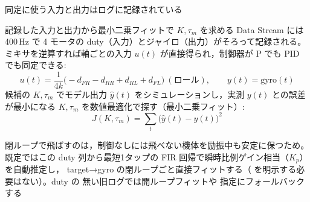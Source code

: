 \begin{frame}{同定に使う入力と出力はログに記録されている\later}
  \begin{block}{記録した入力と出力から最小二乗フィットで $K,\tau_m$ を求める}
    \footnotesize
    \setlength{\abovedisplayskip}{2pt}\setlength{\belowdisplayskip}{2pt}%
    Data Stream には 400\,Hz で 4 モータの duty（入力）とジャイロ（出力）がそろって記録される。
    ミキサを逆算すれば軸ごとの入力 $u(t)$ が直接得られ，制御器が P でも PID でも同定できる:
    \[
      u(t) = \frac{1}{4k}\bigl(-d_{FR} - d_{RR} + d_{RL} + d_{FL}\bigr)\ (\text{ロール}), \qquad
      y(t) = \text{gyro}(t)
    \]
    候補の $K,\tau_m$ でモデル出力 $\hat y(t)$ をシミュレーションし，実測
    $y(t)$ との誤差が最小になる $K,\tau_m$ を数値最適化で探す（最小二乗フィット）:
    \[
      J(K,\tau_m) = \sum_t \bigl(\hat y(t) - y(t)\bigr)^2
    \]
  \end{block}
  {\scriptsize 閉ループで飛ばすのは，制御なしには飛べない機体を励振中も安定に保つため。
  既定ではこの duty 列から最短1タップの FIR 回帰で瞬時比例ゲイン相当（$K_p$）を自動推定し，
  target→gyro の閉ループごと直接フィットする（ を明示する必要はない）。duty の
  無い旧ログでは開ループフィットや  指定にフォールバックする}
\end{frame}

